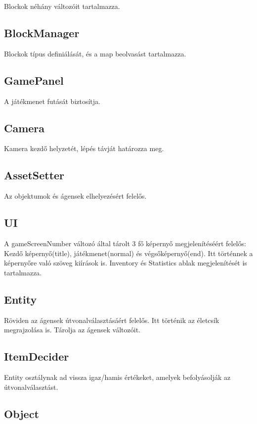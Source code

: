 Blockok néhány változóit tartalmazza.

\subsection{BlockManager}

Blockok típus definiálását, és a map beolvasást tartalmazza.

\subsection{GamePanel}

A játékmenet futását biztosítja.

\subsection{Camera}

Kamera kezdő helyzetét, lépés távját határozza meg.

\subsection{AssetSetter}

Az objektumok és ágensek elhelyezésért felelős.

\subsection{UI}

A gameScreenNumber változó által tárolt 3 fő képernyő megjelenítéséért felelős: Kezdő képernyő(title),
játékmenet(normal) és végsőképernyő(end).
Itt történnek a képernyőre való szöveg kiírások is.
Inventory és Statistics ablak megjelenítését is tartalmazza.

\subsection{Entity}

Röviden az ágensek útvonalválasztásáért felelős. 
Itt történik az életcsík megrajzolása is.
Tárolja az ágensek változóit.

\subsection{ItemDecider}

Entity osztálynak ad vissza igaz/hamis értékeket, amelyek befolyásolják az útvonalválasztást.

\subsection{Object}


